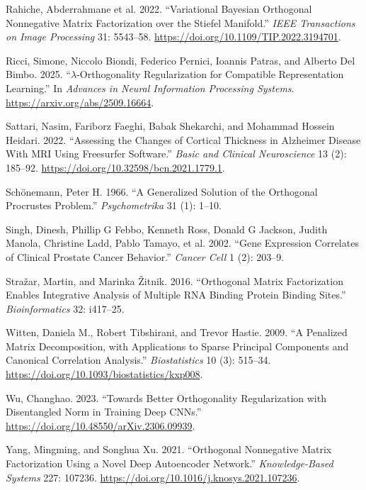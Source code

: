 \documentclass[
]{article}
\newlength{\cslhangindent}
\newenvironment{CSLReferences}[2] %
 {\begin{list}{}{%
  \setlength{\itemindent}{0pt}
  \setlength{\leftmargin}{0pt}
  \setlength{\parsep}{0pt}
  \ifodd #1
   \setlength{\leftmargin}{\cslhangindent}
   \setlength{\itemindent}{-1\cslhangindent}
  \fi
  \setlength{\itemsep}{#2\baselineskip}}}
 {\end{list}}
\begin{document}
\begin{CSLReferences}{1}{0}
Rahiche, Abderrahmane et al. 2022. {``Variational Bayesian Orthogonal Nonnegative Matrix Factorization over the Stiefel Manifold.''} \emph{IEEE Transactions on Image Processing} 31: 5543--58. \url{https://doi.org/10.1109/TIP.2022.3194701}.

Ricci, Simone, Niccolo Biondi, Federico Pernici, Ioannis Patras, and Alberto Del Bimbo. 2025. {``\(\lambda\)-Orthogonality Regularization for Compatible Representation Learning.''} In \emph{Advances in Neural Information Processing Systems}. \url{https://arxiv.org/abs/2509.16664}.

Sattari, Nasim, Fariborz Faeghi, Babak Shekarchi, and Mohammad Hossein Heidari. 2022. {``Assessing the {Changes} of {Cortical} {Thickness} in {Alzheimer} {Disease} {With} {MRI} {Using} {Freesurfer} {Software}.''} \emph{Basic and Clinical Neuroscience} 13 (2): 185--92. \url{https://doi.org/10.32598/bcn.2021.1779.1}.

Schönemann, Peter H. 1966. {``A Generalized Solution of the Orthogonal Procrustes Problem.''} \emph{Psychometrika} 31 (1): 1--10.

Singh, Dinesh, Phillip G Febbo, Kenneth Ross, Donald G Jackson, Judith Manola, Christine Ladd, Pablo Tamayo, et al. 2002. {``Gene Expression Correlates of Clinical Prostate Cancer Behavior.''} \emph{Cancer Cell} 1 (2): 203--9.

Stražar, Martin, and Marinka Žitnik. 2016. {``Orthogonal Matrix Factorization Enables Integrative Analysis of Multiple RNA Binding Protein Binding Sites.''} \emph{Bioinformatics} 32: i417--25.

Witten, Daniela M., Robert Tibshirani, and Trevor Hastie. 2009. {``A Penalized Matrix Decomposition, with Applications to Sparse Principal Components and Canonical Correlation Analysis.''} \emph{Biostatistics} 10 (3): 515--34. \url{https://doi.org/10.1093/biostatistics/kxp008}.

Wu, Changhao. 2023. {``Towards Better Orthogonality Regularization with Disentangled Norm in Training Deep CNNs.''} \url{https://doi.org/10.48550/arXiv.2306.09939}.

Yang, Mingming, and Songhua Xu. 2021. {``Orthogonal Nonnegative Matrix Factorization Using a Novel Deep Autoencoder Network.''} \emph{Knowledge-Based Systems} 227: 107236. \url{https://doi.org/10.1016/j.knosys.2021.107236}.


\end{CSLReferences}
\end{document}
